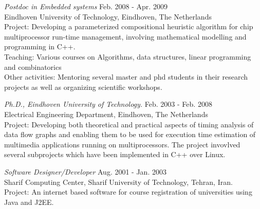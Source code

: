 {\sl Postdoc in Embedded systems}  \hfill Feb. 2008 - Apr. 2009 \\
Eindhoven University of Technology, Eindhoven, The Netherlands \\
\ifindustry
Project: Developing a parameterized compositional heuristic algorithm for chip multiprocessor run-time management, involving mathematical modelling and programming in C++.\\
Teaching: Various courses on Algorithms, data structures, linear programming and combinatorics \\
Other activities: Mentoring several master and phd students in their research projects as well as organizing scientific workshops.
\fi

{\sl Ph.D., Eindhoven University of Technology.} \hfill Feb. 2003 - Feb. 2008 \\
Electrical Engineering Department, Eindhoven, The Netherlands \\
\ifindustry
Project: Developing both theoretical and practical aspects of timing analysis of data flow graphs
and enabling them to be used for execution time estimation of multimedia applications running on multiprocessors.
The project invovlved several subprojects which have been implemented in C++ over Linux.
\fi

{\sl Software Designer/Developer}  \hfill Aug. 2001 - Jan. 2003 \\
Sharif Computing Center, Sharif University of Technology, Tehran, Iran. \\
\ifindustry
Project: An internet based software for course registration of universities using Java and J2EE.
\fi
